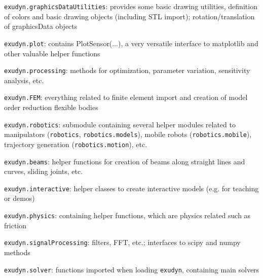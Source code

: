     \item[--] \texttt{exudyn.graphicsDataUtilities}: provides some basic drawing utilities, definition of colors and basic drawing objects (including \acs{STL} import); rotation/translation of graphicsData objects
    \item[--] \texttt{exudyn.plot}: contains PlotSensor(...), a very versatile interface to matplotlib and other valuable helper functions
    \item[--] \texttt{exudyn.processing}: methods for optimization, parameter variation, sensitivity analysis, etc.
    \item[--] \texttt{exudyn.FEM}: everything related to finite element import and creation of model order reduction flexible bodies
    \item[--] \texttt{exudyn.robotics}: submodule containing several helper modules related to manipulators (\texttt{robotics}, \texttt{robotics.models}), mobile robots (\texttt{robotics.mobile}), trajectory generation (\texttt{robotics.motion}), etc.
    \item[--] \texttt{exudyn.beams}: helper functions for creation of beams along straight lines and curves, sliding joints, etc.
    \item[--] \texttt{exudyn.interactive}: helper classes to create interactive models (e.g. for teaching or demos)
    \item[--] \texttt{exudyn.physics}: containing helper functions, which are physics related such as friction
    \item[--] \texttt{exudyn.signalProcessing}: filters, FFT, etc.; interfaces to scipy and numpy methods
    \item[--] \texttt{exudyn.solver}: functions imported when loading \texttt{exudyn}, containing main solvers
  \ei
\ei
%
